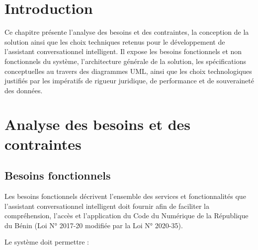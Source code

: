 \section*{Introduction}

Ce chapitre présente l'analyse des besoins et des contraintes, la conception de la solution ainsi que les choix techniques retenus pour le développement de l'assistant conversationnel intelligent. Il expose les besoins fonctionnels et non fonctionnels du système, l'architecture générale de la solution, les spécifications conceptuelles au travers des diagrammes UML, ainsi que les choix technologiques justifiés par les impératifs de rigueur juridique, de performance et de souveraineté des données.

\section{Analyse des besoins et des contraintes}

\subsection{Besoins fonctionnels}

Les besoins fonctionnels décrivent l'ensemble des services et fonctionnalités que l'assistant conversationnel intelligent doit fournir afin de faciliter la compréhension, l'accès et l'application du Code du Numérique de la République du Bénin (Loi N° 2017-20 modifiée par la Loi N° 2020-35).

Le système doit permettre :


